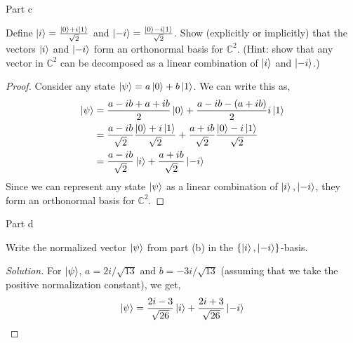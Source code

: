 \begin{solution}{Part c}\label{ques:3c}
  \begin{question}
    Define $\ket{i} = \frac{\ket{0} + i \ket{1}}{\sqrt{2}}$ and $\ket{-i} = \frac{\ket{0} - i\ket{1}}{\sqrt{2}}$. Show (explicitly or implicitly) that the vectors $\ket{i}$ and $\ket{-i}$ form an orthonormal basis for $\mathbb{C}^2$.
(Hint: show that any vector in $\mathbb{C}^2$ can be decomposed as a linear combination of $\ket{i}$ and $\ket{-i}$.)
  \end{question}
  \tcblower{}
  \begin{proof}
    Consider any state $\ket{\psi} = a\ket{0} + b\ket{1}$. We can write this as,
    \begin{equation}
      \begin{split}
        \ket{\psi} &= \frac{a - ib + a + ib}{2}\ket{0} + \frac{a - ib - (a + ib)}{2}i\ket{1}\\
                   &= \frac{a - ib}{\sqrt{2}}\frac{\ket{0} + i\ket{1}}{\sqrt{2}} + \frac{a + ib}{\sqrt{2}}\frac{\ket{0} - i\ket{1}}{\sqrt{2}}\\
                   &= \frac{a - ib}{\sqrt{2}}\ket{i} + \frac{a + ib}{\sqrt{2}}\ket{-i}
      \end{split}
    \end{equation}
    Since we can represent any state $\ket{\psi}$ as a linear combination of $\ket{i}, \ket{-i}$, they form an orthonormal basis for $\mathbb{C}^2$.
  \end{proof}
\end{solution}

\begin{solution}{Part d}\label{ques:3d}
  \begin{question}
    Write the normalized vector $\ket{\psi}$ from part (b) in the $\{\ket{i}, \ket{-i}\}$-basis.
  \end{question}
  \tcblower{}
  \begin{proof}[Solution]
    For $\ket{\psi}$, $a = 2i/\sqrt{13}$ and $b = -3i/\sqrt{13}$ (assuming that we take the positive normalization constant), we get,
    \begin{equation}
      \ket{\psi} = \frac{2i - 3}{\sqrt{26}}\ket{i} + \frac{2i + 3}{\sqrt{26}}\ket{-i}
    \end{equation}
  \end{proof}
\end{solution}
